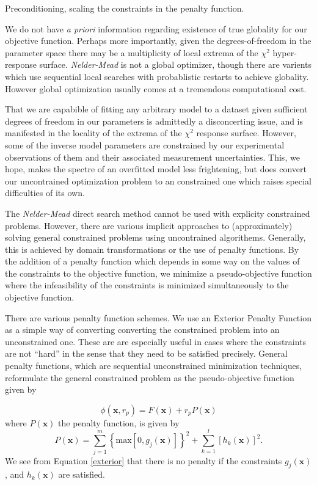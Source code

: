 \documentclass[10pt,a4paper]{article}
\begin{document}
Preconditioning, scaling the constraints in the penalty function.

We do not have \emph{a priori} information regarding existence of true globality for our objective function. Perhaps more importantly, given the degrees-of-freedom in the parameter space there may be a multiplicity of local extrema of the $\chi^2$ hyper-response surface. \emph{Nelder-Mead} is not a global optimizer, though there are varients which use sequential local searches with probablistic restarts to achieve globality. However global optimization usually comes at a tremendous computational cost.

That we are capabible of fitting any arbitrary model to a dataset given sufficient degrees of freedom in our parameters is admittedly a disconcerting issue, and is manifested in the locality of the extrema of the $\chi^2$ response surface. However, some of the inverse model parameters are constrained by our experimental observations of them and their associated measurement uncertainties. This, we hope, makes the spectre of an overfitted model less frightening, but does convert our uncontrained optimization problem to an constrained one which raises special difficulties of its own. 

The \emph{Nelder-Mead} direct search method cannot be used with explicity constrained problems. However, there are various implicit approaches to (approximately) solving general constrained problems using uncontrained algorithems. Generally, this is achieved by domain transformations or the use of penalty functions.  By the addition of a penalty function which depends in some way on the values of the constraints to the objective function, we minimize a pseudo-objective function where the infeasibility of the constraints is minimized simultaneously to the objective function. 

There are various penalty function schemes. We use an Exterior Penalty Function as a simple way of converting converting the constrained problem into an unconstrained one. These are are especially useful in cases where the constraints are not ``hard'' in the sense that they need to be satisfied precisely. General penalty functions, which are sequential unconstrained minimization techniques, reformulate the general constrained problem as the pseudo-objective function given by

\[ \phi(\mathbf{x}, r_p ) = F(\mathbf{x}) + r_p P(\mathbf{x}) \]
where $P \left( \mathbf{x} \right)$ the penalty function, is given by
\begin{equation} \label{exterior}
 P( \mathbf{x} ) = \sum_{j = 1}^m \left\lbrace \mbox{max} \left[ 0, g_j(\mathbf{x} ) \right] \right\rbrace^2 + 
\sum_{k = 1}^l \left[ h_k( \mathbf{x}) \right]^2 .
\end{equation}
We see from Equation \ref{exterior} that there is no penalty if the constraints $g_j(\mathbf{x})$, and $h_k(\mathbf{x})$ are satisfied.
 
\end{document}

